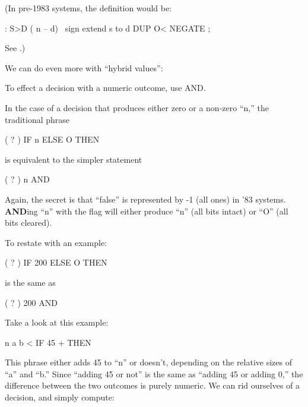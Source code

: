 (In pre-1983 systems, the definition would be:

\begin{Code}
: S>D  ( n -- d)  \ sign extend s to d
     DUP  O< NEGATE ;
\end{Code}
See .)

We can do even more with ``hybrid values'':

\begin{tip}
To effect a decision with a numeric outcome, use AND.
\end{tip}
In the case of a decision that produces either zero or a non-zero ``n,'' the
traditional phrase

\begin{Code}
( ? ) IF  n  ELSE  O  THEN
\end{Code}
is equivalent to the simpler statement

\begin{Code}
( ? )  n AND
\end{Code}
Again, the secret is that ``false'' is represented by -1 (all ones) in '83
\Forth{} systems. \textbf{AND}ing ``n'' with the flag will either produce ``n'' (all
bits intact) or ``O'' (all bits cleared).

To restate with an example:

\begin{Code}
( ? )  IF  200  ELSE  O  THEN
\end{Code}
is the same as

\begin{Code}
( ? )  200 AND
\end{Code}
Take a look at this example:

\begin{Code}
n  a b <  IF  45 +  THEN
\end{Code}
This phrase either adds 45 to ``n'' or doesn't, depending on the relative
sizes of ``a'' and ``b.'' Since ``adding 45 or not'' is the same as ``adding 45
or adding 0,'' the difference between the two outcomes is purely numeric.
We can rid ourselves of a decision, and simply compute:

